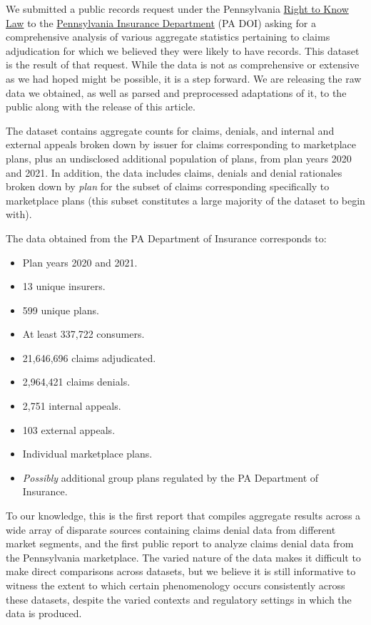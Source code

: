 \documentclass[12pt, a4paper,twoside,parskip=full]{report}
\theoremstyle{plain} %
\theoremstyle{definition} %
\theoremstyle{remark} %
\numberwithin{equation}{chapter}
\begin{document}
\begin{itemize}
\begin{tcolorbox}
			We submitted a public records request under the Pennsylvania \href{https://www.insurance.pa.gov/right-to-know-law/Pages/default.aspx}{Right to Know Law} to the \href{https://www.insurance.pa.gov/Pages/default.aspx}{Pennsylvania Insurance Department} (PA DOI) asking for a comprehensive analysis of various aggregate statistics pertaining to claims adjudication for which we believed they were likely to have records. This dataset is the result of that request. While the data is not as comprehensive or extensive as we had hoped might be possible, it is a step forward. We are releasing the raw data we obtained, as well as parsed and preprocessed adaptations of it, to the public along with the release of this article.
			
			The dataset contains aggregate counts for claims, denials, and internal and external appeals broken down by issuer for claims corresponding to marketplace plans, plus an undisclosed additional population of plans, from plan years 2020 and 2021. In addition, the data includes claims, denials and denial rationales broken down by \emph{plan} for the subset of claims corresponding specifically to marketplace plans (this subset constitutes a large majority of the dataset to begin with).
			
			The data obtained from the PA Department of Insurance corresponds to:
			
			\begin{itemize}
				\item Plan years 2020 and 2021.
				\item 13 unique insurers.
				\item 599 unique plans.
				\item At least 337,722 consumers.
				\item 21,646,696 claims adjudicated.
				\item 2,964,421 claims denials.
				\item 2,751 internal appeals.
				\item 103 external appeals.
				\item Individual marketplace plans.
				\item \emph{Possibly} additional group plans regulated by the PA Department of Insurance.
			\end{itemize}
		\end{tcolorbox}
	
	
	
		\end{itemize}
	
		
		To our knowledge, this is the first report that compiles aggregate results across a wide array of disparate sources
		containing claims denial data from different market segments, and the first public report to analyze claims denial
		data from the Pennsylvania marketplace. The varied nature of the data makes it difficult to make direct comparisons
		across datasets, but we believe it is still informative to witness the extent to which certain phenomenology occurs
		consistently across these datasets, despite the varied contexts and regulatory settings in which the data is produced.
		
\end{document}
